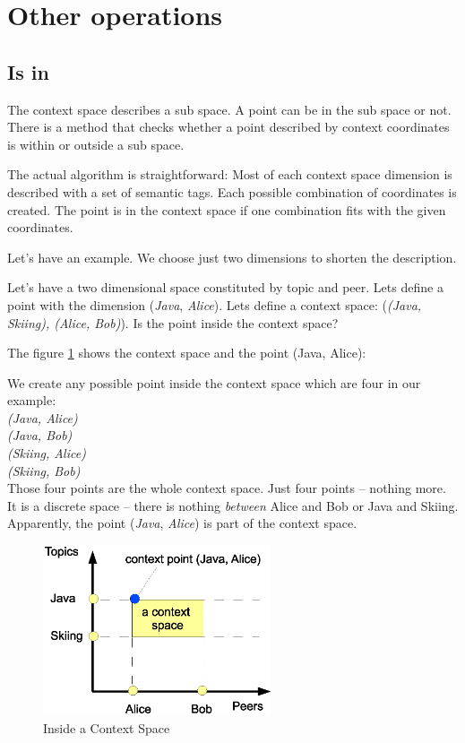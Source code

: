 \section{Other operations}

\subsection{Is in}
The context space describes a sub space. A point can be in the sub space or not.
There is a method that checks whether a point described by context coordinates is within or outside a sub space.

The actual algorithm is straightforward: Most of each context space dimension is described with a set of semantic tags. Each possible combination of coordinates is created. The point is in the context space if one combination fits with the given coordinates.

Let's have an example. We choose just two dimensions to shorten the description. 

Let's have a two dimensional space constituted by topic and peer. Lets define a point with the dimension ({\it Java}, {\it Alice}). Lets define a context space:
({\it (Java, Skiing), (Alice, Bob)}). Is the point inside the context space?

The figure \ref{fig:csIsIn} shows the context space and the point (Java, Alice):

We create any possible point inside the context space which are four in our example:\\
{\it (Java, Alice)}\\
{\it (Java, Bob)}\\
{\it (Skiing, Alice)}\\
{\it (Skiing, Bob)}\\

Those four points are the whole context space. Just four points -- nothing more. It is a discrete space -- there is nothing {\it between} Alice and Bob or Java and Skiing. Apparently, the point ({\it Java}, {\it Alice}) is part of the context space.

\begin{figure}[t]
\centering
\includegraphics[width=0.60\textwidth]{insideAContextSpace.eps}
\caption{Inside a Context Space}
\label{fig:csIsIn}
\end{figure}

